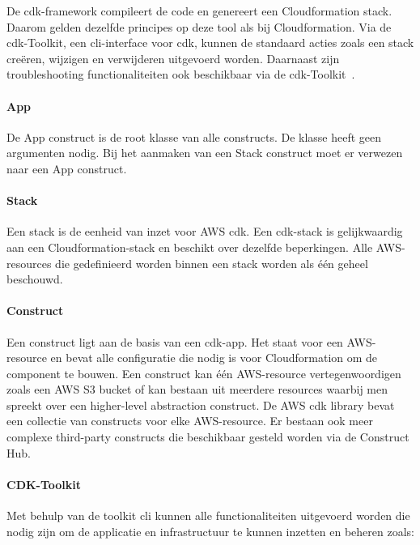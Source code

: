 De \acrshort{cdk}-framework compileert de code en genereert een Cloudformation stack.
Daarom gelden dezelfde principes op deze tool als bij Cloudformation.
Via de \acrshort{cdk}-Toolkit, een \acrshort{cli}-interface voor \acrshort{cdk}, kunnen de standaard acties zoals een stack creëren, wijzigen en verwijderen uitgevoerd worden.
Daarnaast zijn troubleshooting functionaliteiten ook beschikbaar via de \acrshort{cdk}-Toolkit~\autocite{Mansoor2014}.

\paragraph{App}

De App construct is de root klasse van alle constructs.
De klasse heeft geen argumenten nodig.
Bij het aanmaken van een Stack construct moet er verwezen naar een App construct.

\paragraph{Stack}

Een stack is de eenheid van inzet voor AWS \acrshort{cdk}.
Een \acrshort{cdk}-stack is gelijkwaardig aan een Cloudformation-stack en beschikt over dezelfde beperkingen.
Alle AWS-resources die gedefinieerd worden binnen een stack worden als één geheel beschouwd.

\paragraph{Construct}

Een construct ligt aan de basis van een \acrshort{cdk}-app.
Het staat voor een AWS-resource en bevat alle configuratie die nodig is voor Cloudformation om de component te bouwen.
Een construct kan één AWS-resource vertegenwoordigen zoals een AWS S3 bucket of kan bestaan uit meerdere resources waarbij men spreekt over een higher-level abstraction construct.
De AWS \acrshort{cdk} library bevat een collectie van constructs voor elke AWS-resource.
Er bestaan ook meer complexe third-party constructs die beschikbaar gesteld worden via de Construct Hub.

\paragraph{CDK-Toolkit}

Met behulp van de toolkit \acrshort{cli} kunnen alle functionaliteiten uitgevoerd worden die nodig zijn om de applicatie en infrastructuur te kunnen inzetten en beheren zoals:

